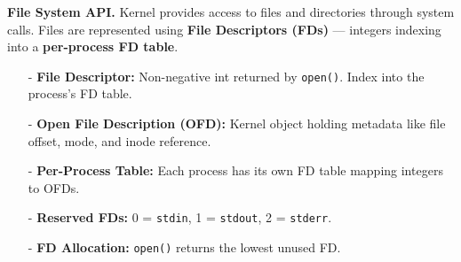 \documentclass[8pt]{extarticle}
\begin{document}
\newpage
\hspace{-20px}
\begin{minipage}[htp]{0.5\textwidth}
    \noindent\textbf{File System API.} Kernel provides access to files and directories through system calls. Files are represented using \textbf{File Descriptors (FDs)} — integers indexing into a \textbf{per-process FD table}.

    \begin{itemize}[noitemsep,nolistsep,topsep=-10px,partopsep=0pt,parsep=0pt]
        \item[-] \textbf{File Descriptor:} Non-negative int returned by \texttt{open()}. Index into the process’s FD table.
        \item[-] \textbf{Open File Description (OFD):} Kernel object holding metadata like file offset, mode, and inode reference.
        \item[-] \textbf{Per-Process Table:} Each process has its own FD table mapping integers to OFDs.
        \item[-] \textbf{Reserved FDs:} 0 = \texttt{stdin}, 1 = \texttt{stdout}, 2 = \texttt{stderr}.
        \item[-] \textbf{FD Allocation:} \texttt{open()} returns the lowest unused FD.
    \end{itemize}


\end{minipage}
\end{document}
